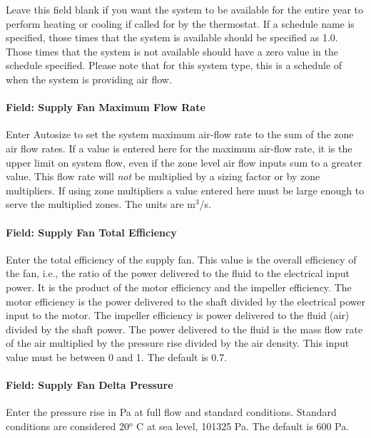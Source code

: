 Leave this field blank if you want the system to be available for the entire year to perform heating or cooling if called for by the thermostat. If a schedule name is specified, those times that the system is available should be specified as 1.0. Those times that the system is not available should have a zero value in the schedule specified. Please note that for this system type, this is a schedule of when the system is providing air flow.

\paragraph{Field: Supply Fan Maximum Flow Rate}\label{field-supply-fan-maximum-flow-rate-3}

Enter Autosize to set the system maximum air-flow rate to the sum of the zone air flow rates. If a value is entered here for the maximum air-flow rate, it is the upper limit on system flow, even if the zone level air flow inputs sum to a greater value. This flow rate will \emph{not} be multiplied by a sizing factor or by zone multipliers. If using zone multipliers a value entered here must be large enough to serve the multiplied zones. The units are m\(^{3}\)/s.

\paragraph{Field: Supply Fan Total Efficiency}\label{field-supply-fan-total-efficiency-10}

Enter the total efficiency of the supply fan. This value is the overall efficiency of the fan, i.e., the ratio of the power delivered to the fluid to the electrical input power. It is the product of the motor efficiency and the impeller efficiency. The motor efficiency is the power delivered to the shaft divided by the electrical power input to the motor. The impeller efficiency is power delivered to the fluid (air) divided by the shaft power. The power delivered to the fluid is the mass flow rate of the air multiplied by the pressure rise divided by the air density. This input value must be between 0 and 1. The default is 0.7.

\paragraph{Field: Supply Fan Delta Pressure}\label{field-supply-fan-delta-pressure-9}

Enter the pressure rise in Pa at full flow and standard conditions. Standard conditions are considered 20\(^{o}\) C at sea level, 101325 Pa. The default is 600 Pa.

